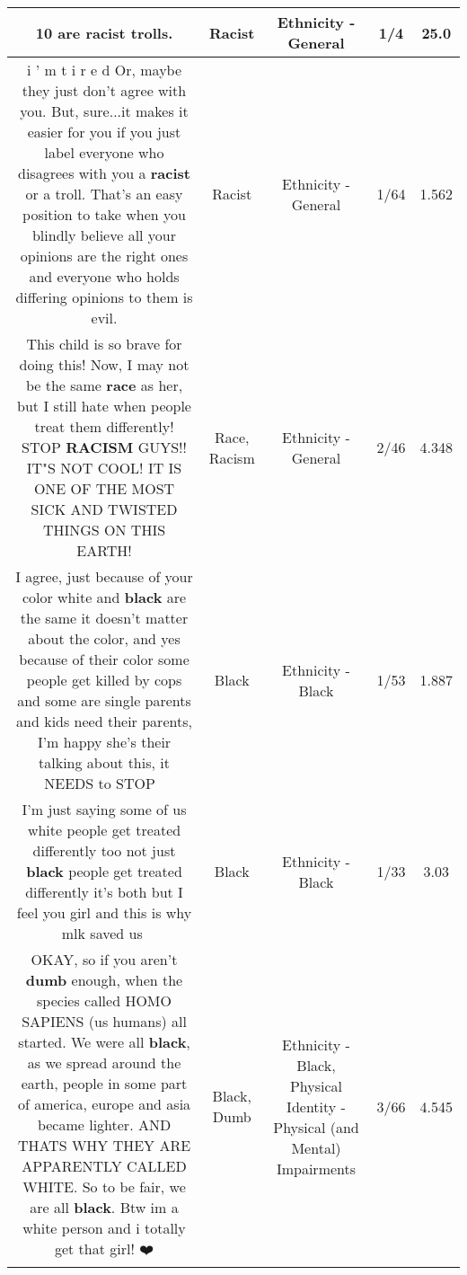 \documentclass[11pt]{article}
\newlength\mylength
\begin{document}
\begin{center}
\begin{longtable}{|C{.65\mylength}|C{.30\mylength}|C{.12\mylength}|C{.12\mylength}|C{.12\mylength}|}
  \small 10 are \textbf{racist} trolls.\normalsize   & Racist & Ethnicity - General & 1/4 & 25.0 \\  \hline
  \small i ' m t i r e d Or, maybe they just don't agree with you. But, sure...it makes it easier for you if you just label everyone who disagrees with you a \textbf{racist} or a troll. That's an easy position to take when you blindly believe all your opinions are the right ones and everyone who holds differing opinions to them is evil.\normalsize   & Racist & Ethnicity - General & 1/64 & 1.562 \\  \hline
  \small This child is so brave for doing this! Now, I may not be the same \textbf{race} as her, but I still hate when people treat them differently! STOP \textbf{RACISM} GUYS!! IT"S NOT COOL! IT IS ONE OF THE MOST SICK AND TWISTED THINGS ON THIS EARTH!\normalsize   & Race, Racism & Ethnicity - General & 2/46 & 4.348 \\  \hline
  \small I agree, just because of your color white and \textbf{black} are the same it doesn't matter about the color, and yes because of their color some people get killed by cops and some are single parents and kids need their parents, I'm happy she's their talking about this, it NEEDS to STOP 🛑\normalsize   & Black & Ethnicity - Black & 1/53 & 1.887 \\  \hline
  \small I'm just saying some of us white people get treated differently too not just \textbf{black} people get treated differently it's both but I feel you girl and this is why mlk saved us💝\normalsize   & Black & Ethnicity - Black & 1/33 & 3.03 \\  \hline
  \small OKAY, so if you aren't \textbf{dumb} enough, when the species called HOMO SAPIENS (us humans) all started. We were all \textbf{black}, as we spread around  the earth, people in some part of america, europe and asia became lighter. AND THATS WHY THEY ARE APPARENTLY CALLED WHITE. So to be fair, we are all \textbf{black}. Btw im a white person and i totally get that girl! ❤️\normalsize   & Black, Dumb & Ethnicity - Black, Physical Identity - Physical (and Mental) Impairments & 3/66 & 4.545 \\  \hline

\end{longtable}
\end{center}
\end{document}

